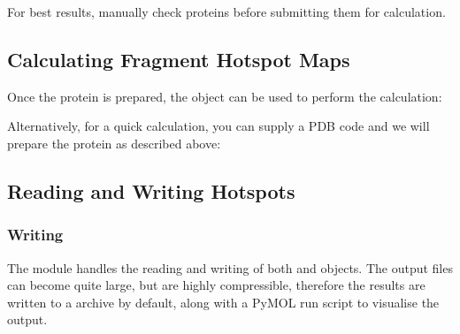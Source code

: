 \documentclass[letterpaper,10pt,english]{sphinxmanual}
\begin{document}
For best results, manually check proteins before submitting them for calculation.


\subsection{Calculating Fragment Hotspot Maps}
\label{\detokenize{tutorial:calculating-fragment-hotspot-maps}}
Once the protein is prepared, the {\hyperref[\detokenize{calculation_api:hotspots.calculation.Runner}]{}} object can be used to perform the calculation:

\begin{sphinxVerbatim}[commandchars=\\\{\}]
   

  
  
\end{sphinxVerbatim}

Alternatively, for a quick calculation, you can supply a PDB code and we will prepare the protein as described above:

\begin{sphinxVerbatim}[commandchars=\\\{\}]
  
  
\end{sphinxVerbatim}


\subsection{Reading and Writing Hotspots}
\label{\detokenize{tutorial:reading-and-writing-hotspots}}

\subsubsection{Writing}
\label{\detokenize{tutorial:writing}}
The {\hyperref[\detokenize{hs_io_api:module-hotspots.hs_io}]{}} module handles the reading and writing of both 
and  objects. The output  files can become quite large, but are highly
compressible, therefore the results are written to a  archive by default, along with a PyMOL run script to
visualise the output.
\end{document}
